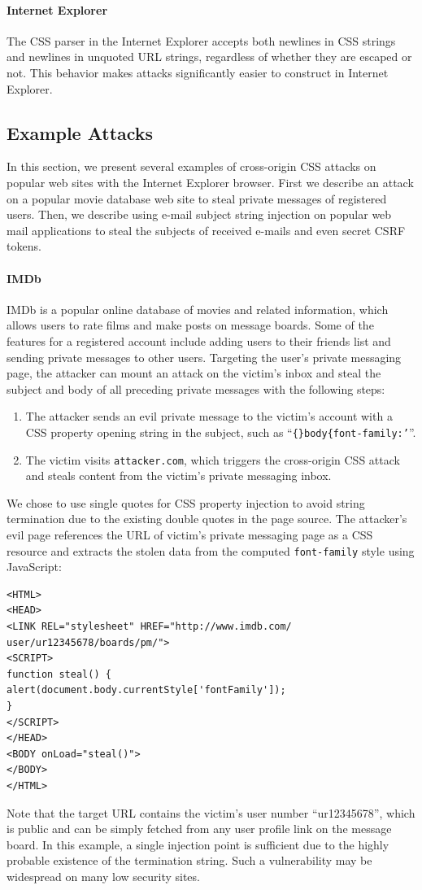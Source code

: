 \documentclass{acm_proc_article-sp}
\begin{document}
\paragraph{Internet Explorer}
The CSS parser in the Internet Explorer accepts both newlines in CSS strings and newlines in unquoted URL strings, regardless of whether they are escaped or not. This behavior makes attacks significantly easier to construct in Internet Explorer.

\subsection{Example Attacks}
In this section, we present several examples of cross-origin CSS attacks on popular web sites with the Internet Explorer browser. First we describe an attack on a popular movie database web site to steal private messages of registered users. Then, we describe using e-mail subject string injection on popular web mail applications to steal the subjects of received e-mails and even secret CSRF tokens.

\paragraph{IMDb} IMDb is a popular online database of movies and related information, which allows users to rate films and make posts on message boards. Some of the features for a registered account include adding users to their friends list and sending private messages to other users. Targeting the user's private messaging page, the attacker can mount an attack on the victim's inbox and steal the subject and body of all preceding private messages with the following steps:
\begin{enumerate}
\item{The attacker sends an evil private message to the victim's account with a CSS property opening string in the subject, such as ``\texttt{\{\}body\{font-family:'}''.}
\item{The victim visits \texttt{attacker.com}, which triggers the cross-origin CSS attack and steals content from the victim's private messaging inbox.}
\end{enumerate}
We chose to use single quotes for CSS property injection to avoid string termination due to the existing double quotes in the page source. The attacker's evil page references the URL of victim's private messaging page as a CSS resource and extracts the stolen data from the computed \texttt{font-family} style using JavaScript:
\begin{verbatim}
<HTML>
<HEAD>
<LINK REL="stylesheet" HREF="http://www.imdb.com/
user/ur12345678/boards/pm/">
<SCRIPT>
function steal() {
alert(document.body.currentStyle['fontFamily']);
}
</SCRIPT>
</HEAD>
<BODY onLoad="steal()">
</BODY>
</HTML>
\end{verbatim}
Note that the target URL contains the victim's user number ``ur12345678'', which is public and can be simply fetched from any user profile link on the message board. In this example, a single injection point is sufficient due to the highly probable existence of the termination string. Such a vulnerability may be widespread on many low security sites.
\end{document}
